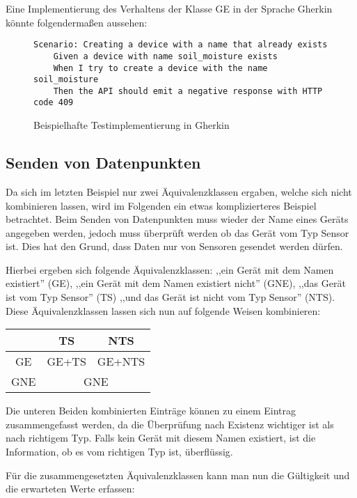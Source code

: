 Eine Implementierung des Verhaltens der Klasse GE in der Sprache Gherkin könnte folgendermaßen aussehen:
\begin{figure}[H]
    \begin{verbatim}
Scenario: Creating a device with a name that already exists    
    Given a device with name soil_moisture exists
    When I try to create a device with the name soil_moisture
    Then the API should emit a negative response with HTTP code 409
    \end{verbatim}
    \label{lst:test_create}
    \caption{Beispielhafte Testimplementierung in Gherkin}
\end{figure}

\subsection{Senden von Datenpunkten}
Da sich im letzten Beispiel nur zwei Äquivalenzklassen ergaben, welche sich nicht kombinieren lassen, wird im Folgenden ein etwas komplizierteres Beispiel betrachtet.
Beim Senden von Datenpunkten muss wieder der Name eines Geräts angegeben werden, jedoch muss überprüft werden ob das Gerät vom Typ Sensor ist.
Dies hat den Grund, dass Daten nur von Sensoren gesendet werden dürfen. 

Hierbei ergeben sich folgende Äquivalenzklassen: ,,ein Gerät mit dem Namen existiert'' (GE), ,,ein Gerät mit dem Namen existiert nicht'' (GNE), ,,das Gerät ist vom Typ Sensor'' (TS) ,,und das Gerät ist nicht vom Typ Sensor'' (NTS).
Diese Äquivalenzklassen lassen sich nun auf folgende Weisen kombinieren:

\begin{center}
    \begin{tabular}{c||c|c}
        &TS&NTS\\
        \hline
        \hline
        GE&GE+TS&GE+NTS\\
        \hline
        GNE& \multicolumn{2}{c}{GNE}\\
    \end{tabular}
\end{center}

Die unteren Beiden kombinierten Einträge können zu einem Eintrag zusammengefasst werden, da die Überprüfung nach Existenz wichtiger ist als nach richtigem Typ.
Falls kein Gerät mit diesem Namen existiert, ist die Information, ob es vom richtigen Typ ist, überflüssig.

Für die zusammengesetzten Äquivalenzklassen kann man nun die Gültigkeit und die erwarteten Werte erfassen:

